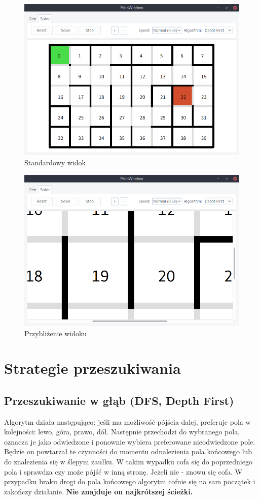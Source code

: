 \documentclass[12pt,a4paper]{article}
\begin{document}
	\begin{figure}[H]
		\centering
		\includegraphics[width=0.8\linewidth]{obrazki/12.png}
		\caption{Standardowy widok}
	\end{figure}
	
	\begin{figure}[H]
		\centering
		\includegraphics[width=0.8\linewidth]{obrazki/13.png}
		\caption{Przybliżenie widoku}
	\end{figure}
	
	\pagebreak
	\section{Strategie przeszukiwania}
	\subsection{Przeszukiwanie w głąb (DFS, Depth First)}
	Algorytm działa następująco: jeśli ma możliwość pójścia dalej,
	preferuje pola w kolejności: lewo, góra, prawo, dół. Następnie 
	przechodzi do wybranego pola, oznacza je jako odwiedzone i ponownie
	wybiera preferowane nieodwiedzone pole. 
	Będzie on powtarzał te czynności do momentu odnalezienia 
	pola końcowego lub do znalezienia się w ślepym zaułku. W takim	
	wypadku cofa się do poprzedniego pola i sprawdza czy może pójść w 
	inną stronę. Jeżeli nie - znowu się cofa. W przypadku braku
	drogi do pola końcowego algorytm cofnie się na sam początek i
	zakończy działanie. \textbf{Nie znajduje on najkrótszej ścieżki.}
	
\end{document}
